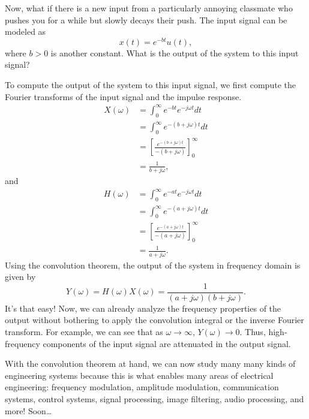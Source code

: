 Now, what if there is a new input from a particularly annoying classmate who pushes you for a while but slowly decays their push. The input signal can be modeled as
\[
x(t) = e^{-b t} u(t),
\]
where $b > 0$ is another constant. What is the output of the system to this input signal?

To compute the output of the system to this input signal, we first compute the Fourier transforms of the input signal and the impulse response.
\[
\begin{aligned}
X(\omega) &= \int_{0}^{\infty} e^{-b t} e^{-j \omega t} dt \\
&= \int_{0}^{\infty} e^{-(b + j \omega) t} dt \\
&= \left[ \frac{e^{-(b + j \omega) t}}{-(b + j \omega)} \right]_{0}^{\infty} \\
&= \frac{1}{b + j \omega},
\end{aligned}
\]
and
\[
\begin{aligned}
H(\omega) &= \int_{0}^{\infty} e^{-a t} e^{-j \omega t} dt \\
&= \int_{0}^{\infty} e^{-(a + j \omega) t} dt \\
&= \left[ \frac{e^{-(a + j \omega) t}}{-(a + j \omega)} \right]_{0}^{\infty} \\
&= \frac{1}{a + j \omega}.
\end{aligned}
\]
Using the convolution theorem, the output of the system in frequency domain is given by
\[
Y(\omega) = H(\omega) X(\omega) = \frac{1}{(a + j \omega)(b + j \omega)}.
\]
It's that easy! Now, we can already analyze the frequency properties of the output without bothering to apply the convolution integral or the inverse Fourier transform. For example, we can see that as $\omega \to \infty$, $Y(\omega) \to 0$. Thus, high-frequency components of the input signal are attenuated in the output signal.

With the convolution theorem at hand, we can now study many many kinds of engineering systems because this is what enables many areas of electrical engineering: frequency modulation, amplitude modulation, communication systems, control systems, signal processing, image filtering, audio processing, and more! Soon\dots

